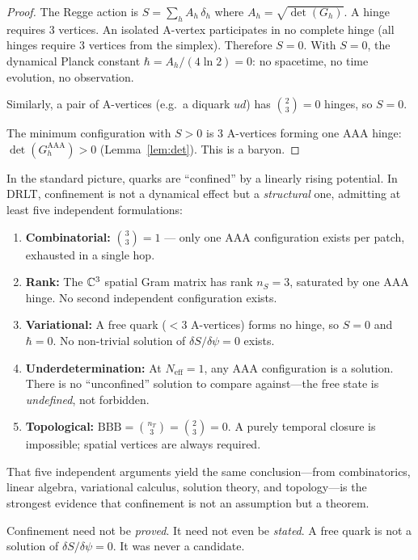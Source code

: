 \begin{proof}
The Regge action is $S = \sum_h A_h\,\delta_h$ where $A_h = \sqrt{\det(G_h)}$.  A hinge requires 3 vertices.  An isolated A-vertex participates in no complete hinge (all hinges require 3 vertices from the simplex).  Therefore $S = 0$.  With $S = 0$, the dynamical Planck constant $\hbar = A_h/(4\ln 2) = 0$: no spacetime, no time evolution, no observation.

Similarly, a pair of A-vertices (e.g.\ a diquark $ud$) has $\binom{2}{3} = 0$ hinges, so $S = 0$.

The minimum configuration with $S > 0$ is 3 A-vertices forming one AAA hinge: $\det(G_h^{\mathrm{AAA}}) > 0$ (Lemma~\ref{lem:det}).  This is a baryon.
\end{proof}

\begin{remark}
In the standard picture, quarks are ``confined'' by a linearly rising potential.  In DRLT, confinement is not a dynamical effect but a \emph{structural} one, admitting at least five independent formulations:
\begin{enumerate}
\item \textbf{Combinatorial:} $\binom{3}{3} = 1$ --- only one AAA configuration exists per patch, exhausted in a single hop.
\item \textbf{Rank:} The $\mathbb{C}^3$ spatial Gram matrix has rank $n_S = 3$, saturated by one AAA hinge.  No second independent configuration exists.
\item \textbf{Variational:} A free quark ($< 3$ A-vertices) forms no hinge, so $S = 0$ and $\hbar = 0$.  No non-trivial solution of $\delta S/\delta\psi = 0$ exists.
\item \textbf{Underdetermination:} At $N_\text{eff} = 1$, any AAA configuration is a solution.  There is no ``unconfined'' solution to compare against---the free state is \emph{undefined}, not forbidden.
\item \textbf{Topological:} $\text{BBB} = \binom{n_T}{3} = \binom{2}{3} = 0$.  A purely temporal closure is impossible; spatial vertices are always required.
\end{enumerate}
That five independent arguments yield the same conclusion---from combinatorics, linear algebra, variational calculus, solution theory, and topology---is the strongest evidence that confinement is not an assumption but a theorem.

Confinement need not be \emph{proved}.  It need not even be \emph{stated}.  A free quark is not a solution of $\delta S/\delta\psi = 0$.  It was never a candidate.
\end{remark}

